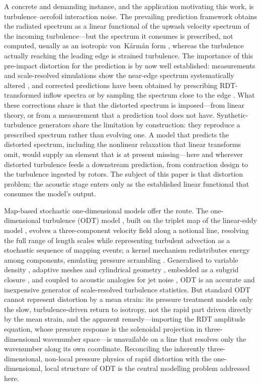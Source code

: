 \documentclass[lineno]{JFM-FLM_Au}
\begin{document}
A concrete and demanding instance, and the application motivating this
work, is turbulence--aerofoil interaction noise. The prevailing
prediction framework \citep{Amiet1975,PatersonAmiet1977,RogerMoreau2010}
obtains the radiated spectrum as a linear functional of the upwash
velocity spectrum of the incoming turbulence---but the spectrum it
consumes is prescribed, not computed, usually as an isotropic
von~K\'arm\'an form \citep{vonKarman1948}, whereas the turbulence
actually reaching the leading edge is strained turbulence. The
importance of this pre-impact distortion for the prediction is by now
well established: measurements and scale-resolved simulations show the
near-edge spectrum systematically altered
\citep{dosSantos2023,Ribeiro2023,Piccolo2024}, and corrected predictions
have been obtained by prescribing RDT-transformed inflow spectra
\citep{deSantana2016,dosSantos2023} or by sampling the spectrum close to
the edge \citep{Piccolo2024}. What these corrections share is that the
distorted spectrum is imposed---from linear theory, or from a
measurement that a prediction tool does not have. Synthetic-turbulence
generators \citep{KimHaeri2015} share the limitation by construction:
they reproduce a prescribed spectrum rather than evolving one. A model that predicts the distorted spectrum, including the nonlinear
relaxation that linear transforms omit, would supply an element that is
at present missing---here and wherever distorted turbulence feeds a
downstream prediction, from contraction design to the turbulence ingested
by rotors. The subject
of this paper is that distortion problem; the acoustic stage enters
only as the established linear functional that consumes the model's
output.

Map-based stochastic one-dimensional models offer the route. The
one-dimensional turbulence (ODT) model
\citep{Kerstein1999,Kerstein2001}, built on the triplet map of the
linear-eddy model \citep{Kerstein1991}, evolves a three-component
velocity field along a notional line, resolving the full range of length
scales while representing turbulent advection as a stochastic sequence
of mapping events; a kernel mechanism redistributes energy among
components, emulating pressure scrambling
\citep{WunschKerstein2001,Kerstein2001}. Generalised to variable density
\citep{AshurstKerstein2005}, adaptive meshes \citep{Lignell2013,
StephensLignell2021} and cylindrical geometry \citep{Lignell2018},
embedded as a subgrid closure \citep{SchmidtKerstein2010}, and coupled
to acoustic analogies for jet noise
\citep{SharmaKleinSchmidt2022,MedinaMendez2023}, ODT is an accurate and
inexpensive generator of scale-resolved turbulence statistics. But standard ODT
cannot represent distortion by a mean strain: its pressure treatment
models only the slow, turbulence-driven return to isotropy, not the
rapid part driven directly by the mean strain, and the
apparent remedy---importing the RDT amplitude equation, whose pressure
response is the solenoidal projection in three-dimensional wavenumber
space---is unavailable on a line that resolves only the wavenumber along
its own coordinate. Reconciling the inherently three-dimensional,
non-local pressure physics of rapid distortion with the one-dimensional,
local structure of ODT is the central modelling problem addressed here.
\end{document}
